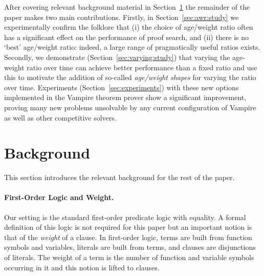 \documentclass{llncs}
\begin{document}
After covering relevant background material in Section~\ref{sec:background} the remainder of the paper makes two main contributions.
Firstly, in Section~\ref{sec:awr:study} we experimentally confirm the folklore that (i) the choice of age/weight ratio often has a significant effect on the performance of proof search, and (ii) there is no `best' age/weight ratio: indeed, a large range of pragmatically useful ratios exists.
Secondly, we demonstrate (Section~\ref{sec:varying:study}) that varying the age-weight ratio over time can achieve better performance than a fixed ratio and use this to motivate the addition of so-called \emph{age/weight shapes} for varying the ratio over time.
Experiments (Section~\ref{sec:experiments}) with these new options implemented in the Vampire theorem prover show a significant improvement, proving many new problems unsolvable by any current configuration of Vampire as well as other competitive solvers.

\section{Background}
\label{sec:background}

This section introduces the relevant background for the rest of the paper.



\paragraph{First-Order Logic and Weight.} Our setting is the standard first-order predicate logic with equality. A formal definition of this logic is not required for this paper but an important notion is that of the \emph{weight} of a clause. In first-order logic,  terms are built from function symbols and variables, literals are built from terms, and clauses are disjunctions of literals. The weight of a term is the number of function and variable symbols occurring in it and this notion is lifted to clauses. 
\end{document}
